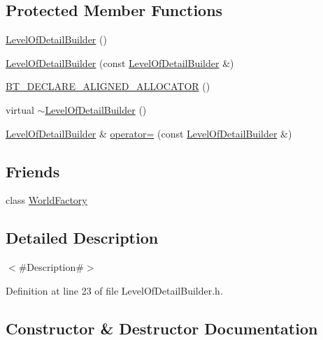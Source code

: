 \subsection*{Protected Member Functions}
\begin{DoxyCompactItemize}
\item 
\mbox{\hyperlink{classnjli_1_1_level_of_detail_builder_a4fb459d11fe33ecec7adffd9bfee1085}{Level\+Of\+Detail\+Builder}} ()
\item 
\mbox{\hyperlink{classnjli_1_1_level_of_detail_builder_a7197fcd03fa97a397ae99f7cc4c7cd94}{Level\+Of\+Detail\+Builder}} (const \mbox{\hyperlink{classnjli_1_1_level_of_detail_builder}{Level\+Of\+Detail\+Builder}} \&)
\item 
\mbox{\hyperlink{classnjli_1_1_level_of_detail_builder_a86c19f728a855df683f126e2662e5841}{B\+T\+\_\+\+D\+E\+C\+L\+A\+R\+E\+\_\+\+A\+L\+I\+G\+N\+E\+D\+\_\+\+A\+L\+L\+O\+C\+A\+T\+OR}} ()
\item 
virtual \mbox{\hyperlink{classnjli_1_1_level_of_detail_builder_ad07b42bddcff462b519b1934348f6c63}{$\sim$\+Level\+Of\+Detail\+Builder}} ()
\item 
\mbox{\hyperlink{classnjli_1_1_level_of_detail_builder}{Level\+Of\+Detail\+Builder}} \& \mbox{\hyperlink{classnjli_1_1_level_of_detail_builder_ae7c4d3968b07a0471168762490a10012}{operator=}} (const \mbox{\hyperlink{classnjli_1_1_level_of_detail_builder}{Level\+Of\+Detail\+Builder}} \&)
\end{DoxyCompactItemize}
\subsection*{Friends}
\begin{DoxyCompactItemize}
\item 
class \mbox{\hyperlink{classnjli_1_1_level_of_detail_builder_acb96ebb09abe8f2a37a915a842babfac}{World\+Factory}}
\end{DoxyCompactItemize}


\subsection{Detailed Description}
$<$\#\+Description\#$>$ 

Definition at line 23 of file Level\+Of\+Detail\+Builder.\+h.



\subsection{Constructor \& Destructor Documentation}
\mbox{\label{classnjli_1_1_level_of_detail_builder_a4fb459d11fe33ecec7adffd9bfee1085}} 
